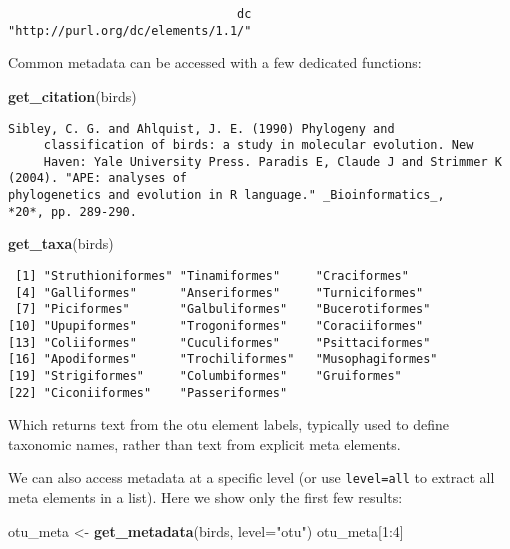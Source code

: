 \documentclass[author-year, review, 11pt]{components/elsarticle} %
\newenvironment{Shaded}{\begin{snugshade}}{\end{snugshade}}
\newcommand{\KeywordTok}[1]{\textcolor[rgb]{0.13,0.29,0.53}{\textbf{{#1}}}}
\newcommand{\DataTypeTok}[1]{\textcolor[rgb]{0.13,0.29,0.53}{{#1}}}
\newcommand{\DecValTok}[1]{\textcolor[rgb]{0.00,0.00,0.81}{{#1}}}
\newcommand{\StringTok}[1]{\textcolor[rgb]{0.31,0.60,0.02}{{#1}}}
\newcommand{\NormalTok}[1]{{#1}}
\begin{document}
\begin{verbatim}
                                dc 
"http://purl.org/dc/elements/1.1/" 
\end{verbatim}

Common metadata can be accessed with a few dedicated functions:

\begin{Shaded}
\begin{Highlighting}[]
\KeywordTok{get_citation}\NormalTok{(birds)}
\end{Highlighting}
\end{Shaded}

\begin{verbatim}
Sibley, C. G. and Ahlquist, J. E. (1990) Phylogeny and
     classification of birds: a study in molecular evolution. New
     Haven: Yale University Press. Paradis E, Claude J and Strimmer K (2004). "APE: analyses of
phylogenetics and evolution in R language." _Bioinformatics_,
*20*, pp. 289-290.
\end{verbatim}

\begin{Shaded}
\begin{Highlighting}[]
\KeywordTok{get_taxa}\NormalTok{(birds)}
\end{Highlighting}
\end{Shaded}

\begin{verbatim}
 [1] "Struthioniformes" "Tinamiformes"     "Craciformes"     
 [4] "Galliformes"      "Anseriformes"     "Turniciformes"   
 [7] "Piciformes"       "Galbuliformes"    "Bucerotiformes"  
[10] "Upupiformes"      "Trogoniformes"    "Coraciiformes"   
[13] "Coliiformes"      "Cuculiformes"     "Psittaciformes"  
[16] "Apodiformes"      "Trochiliformes"   "Musophagiformes" 
[19] "Strigiformes"     "Columbiformes"    "Gruiformes"      
[22] "Ciconiiformes"    "Passeriformes"   
\end{verbatim}

Which returns text from the otu element labels, typically used to define
taxonomic names, rather than text from explicit meta elements.

We can also access metadata at a specific level (or use
\texttt{level=all} to extract all meta elements in a list). Here we show
only the first few results:

\begin{Shaded}
\begin{Highlighting}[]
\NormalTok{otu_meta <-}\StringTok{ }\KeywordTok{get_metadata}\NormalTok{(birds, }\DataTypeTok{level=}\StringTok{"otu"}\NormalTok{)}
\NormalTok{otu_meta[}\DecValTok{1}\NormalTok{:}\DecValTok{4}\NormalTok{]}
\end{Highlighting}
\end{Shaded}
\end{document}
